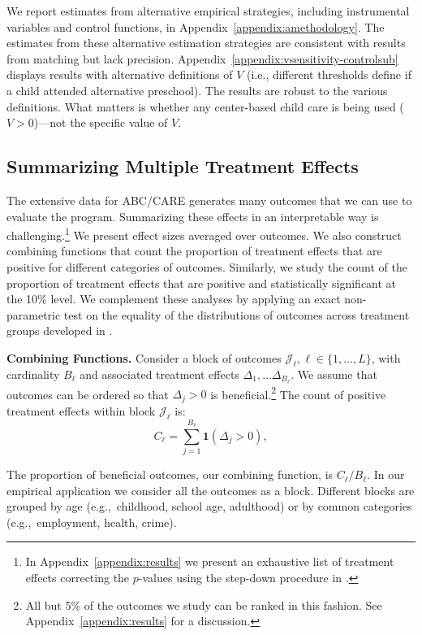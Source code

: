 We report estimates from alternative empirical strategies, including instrumental variables and control functions, in Appendix~\ref{appendix:amethodology}. The estimates from these alternative estimation strategies are consistent with results from matching but lack precision. Appendix~\ref{appendix:vsensitivity-controlsub} displays results with alternative definitions of $V$ (i.e., different thresholds define if a child attended alternative preschool). The results are robust to the various definitions. What matters is whether any center-based child care is being used ($V>0$)---not the specific value of $V$.

\subsection{Summarizing Multiple Treatment Effects}\label{sec:combining-functions}

The extensive data for ABC/CARE generates many outcomes that we can use to evaluate the program. Summarizing these effects in an interpretable way is challenging.\footnote{In Appendix~\ref{appendix:results} we present an exhaustive list of treatment effects correcting the $p$-values using the step-down procedure in \citet{Romano_Wolf_2016_pval_SaPL}.} We present effect sizes averaged over outcomes. We also construct combining functions that count the proportion of treatment effects that are positive for different categories of outcomes. Similarly, we study the count of the proportion of treatment effects that are positive and statistically significant at the 10\% level. We complement these analyses by applying an exact non-parametric test on the equality of the distributions of outcomes across treatment groups developed in \citet{Rosenbaum_2005_Distribution_JRSS}.

\textbf{Combining Functions.} Consider a block of outcomes $\mathcal{J}_{\ell}, \ell \in \{1,\dots ,L\}$, with cardinality $B_{\ell}$ and  associated treatment effects $\Delta_1, \ldots \Delta_{B_\ell}$. We assume that outcomes can be ordered so that $\Delta_{j} >0$ is beneficial.\footnote{All but 5\% of the outcomes we study can be ranked in this fashion. See Appendix~\ref{appendix:results} for a discussion.} The count of positive treatment effects within block $\mathcal{J}_{\ell}$ is:
\begin{equation}
C_\ell = \sum^{B_\ell}_{j=1} \bm{1} (\Delta_{j} >0),
\end{equation}

\noindent The proportion of beneficial outcomes, our combining function, is $C_\ell / B_\ell$. In our empirical application we consider all the outcomes as a block. Different blocks are grouped by age (e.g.,\ childhood, school age, adulthood) or by common categories (e.g.,\ employment, health, crime).


